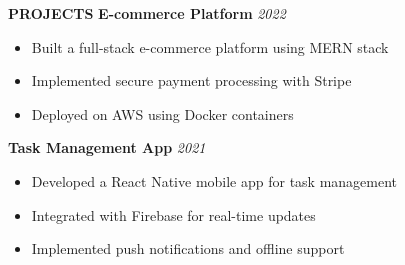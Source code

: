 \documentclass[11pt,a4paper]{article}
\newcommand{\cvsubheader}[1]{\textbf{\large #1}}
\newcommand{\daterange}[1]{\hfill \textit{#1}}
\begin{document}
\vspace{0.3cm}
\cvsubheader{PROJECTS}
\vspace{0.2cm}
\textbf{E-commerce Platform} \daterange{2022}
\begin{itemize}[leftmargin=*]
    \item Built a full-stack e-commerce platform using MERN stack
    \item Implemented secure payment processing with Stripe
    \item Deployed on AWS using Docker containers
\end{itemize}

\textbf{Task Management App} \daterange{2021}
\begin{itemize}[leftmargin=*]
    \item Developed a React Native mobile app for task management
    \item Integrated with Firebase for real-time updates
    \item Implemented push notifications and offline support
\end{itemize}
\end{document}
